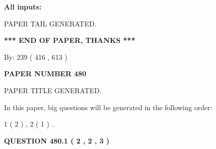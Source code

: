 \documentclass[12pt]{article}
\begin{document}
   
   
   
\noindent{}
   
   
   
   
\noindent\vspace{0.1in}\hspace{-0.08in} {\textbf{\Large{All inputs: }}}
   
   
   
   
   
   
 \vspace{0.2in}
 
   
   
\vspace{2.0in} PAPER TAIL GENERATED.
   
   
   
   
\vspace{1.0in} 
{\textbf{\large{ *** END OF PAPER, THANKS *** }}} 
   
   
\hspace{1.0in} By: 
 239 ( 416 ,  613 )
   
   
   
   
\newpage 
\setcounter{page}{ 
   480001 } 
   
   
   
   
 {\textbf{ \Large{ PAPER NUMBER  480  }}}
   
   
\vspace{0.2in}
   
   
   
   
   
   
   
   
 \vspace{0.2in}
 
 
 
 
   
   
 PAPER TITLE GENERATED.
   
   
   
\vspace{0.2in}
   
In this paper, big questions will be generated in the following order: 
   
   
   1 ( 2 )
 ,
   2 ( 1 )
 .
  
\vspace{0.2in}
  
{\textbf{\Large{QUESTION
480.1 
 ( 2 , 2 , 3 )
}}}
  
\end{document}
